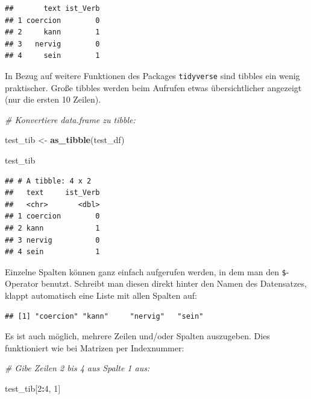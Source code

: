 \documentclass[
  ngerman,
]{book}
\newenvironment{Shaded}{\begin{snugshade}}{\end{snugshade}}
\newcommand{\CommentTok}[1]{\textcolor[rgb]{0.56,0.35,0.01}{\textit{#1}}}
\newcommand{\DecValTok}[1]{\textcolor[rgb]{0.00,0.00,0.81}{#1}}
\newcommand{\FunctionTok}[1]{\textcolor[rgb]{0.13,0.29,0.53}{\textbf{#1}}}
\newcommand{\NormalTok}[1]{#1}
\newcommand{\OtherTok}[1]{\textcolor[rgb]{0.56,0.35,0.01}{#1}}
\newcommand{\SpecialCharTok}[1]{\textcolor[rgb]{0.81,0.36,0.00}{\textbf{#1}}}
\begin{document}
\begin{verbatim}
##       text ist_Verb
## 1 coercion        0
## 2     kann        1
## 3   nervig        0
## 4     sein        1
\end{verbatim}

In Bezug auf weitere Funktionen des Packages \texttt{tidyverse} sind tibbles ein wenig praktischer. Große tibbles werden beim Aufrufen etwas übersichtlicher angezeigt (nur die ersten 10 Zeilen).

\begin{Shaded}
\begin{Highlighting}[]
\CommentTok{\# Konvertiere data.frame zu tibble:}

\NormalTok{test\_tib }\OtherTok{\textless{}{-}} \FunctionTok{as\_tibble}\NormalTok{(test\_df)}

\NormalTok{test\_tib}
\end{Highlighting}
\end{Shaded}

\begin{verbatim}
## # A tibble: 4 x 2
##   text     ist_Verb
##   <chr>       <dbl>
## 1 coercion        0
## 2 kann            1
## 3 nervig          0
## 4 sein            1
\end{verbatim}

Einzelne Spalten können ganz einfach aufgerufen werden, in dem man den \texttt{\$}-Operator benutzt. Schreibt man diesen direkt hinter den Namen des Datensatzes, klappt automatisch eine Liste mit allen Spalten auf:

\begin{Shaded}
\end{Shaded}

\begin{verbatim}
## [1] "coercion" "kann"     "nervig"   "sein"
\end{verbatim}

Es ist auch möglich, mehrere Zeilen und/oder Spalten auszugeben. Dies funktioniert wie bei Matrizen per Indexnummer:

\begin{Shaded}
\begin{Highlighting}[]
\CommentTok{\# Gibe Zeilen 2 bis 4 aus Spalte 1 aus:}

\NormalTok{test\_tib[}\DecValTok{2}\SpecialCharTok{:}\DecValTok{4}\NormalTok{, }\DecValTok{1}\NormalTok{]}
\end{Highlighting}
\end{Shaded}
\end{document}
